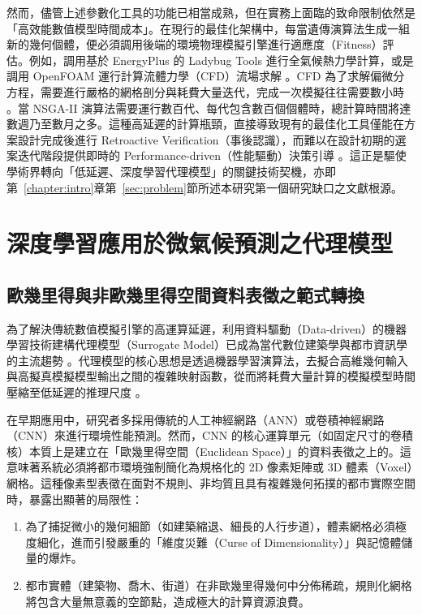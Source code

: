 然而，儘管上述參數化工具的功能已相當成熟，但在實務上面臨的致命限制依然是「高效能數值模型時間成本」。在現行的最佳化架構中，每當遺傳演算法生成一組新的幾何個體，便必須調用後端的環境物理模擬引擎進行適應度（Fitness）評估。例如，調用基於 EnergyPlus 的 Ladybug Tools 進行全氣候熱力學計算，或是調用 OpenFOAM 運行計算流體力學（CFD）流場求解 \citep{sadeghipour2013ladybug}。CFD 為了求解偏微分方程，需要進行嚴格的網格剖分與耗費大量迭代，完成一次模擬往往需要數小時 \citep{xin2025urbangraph}。當 NSGA-II 演算法需要運行數百代、每代包含數百個個體時，總計算時間將達數週乃至數月之多。這種高延遲的計算瓶頸，直接導致現有的最佳化工具僅能在方案設計完成後進行 Retroactive Verification（事後認識），而難以在設計初期的選案迭代階段提供即時的 Performance-driven（性能驅動）決策引導 \citep{aman2023ai,daglier2025developing}。這正是驅使學術界轉向「低延遲、深度學習代理模型」的關鍵技術契機，亦即第~\ref{chapter:intro}章第~\ref{sec:problem}節所述本研究第一個研究缺口之文獻根源。


\section{深度學習應用於微氣候預測之代理模型}
\label{sec:surrogate_review}

\subsection{歐幾里得與非歐幾里得空間資料表徵之範式轉換}
\label{subsec:gnn_paradigm}

為了解決傳統數值模擬引擎的高運算延遲，利用資料驅動（Data-driven）的機器學習技術建構代理模型（Surrogate Model）已成為當代數位建築學與都市資訊學的主流趨勢 \citep{westermann2019surrogate,wu2023data}。代理模型的核心思想是透過機器學習演算法，去擬合高維幾何輸入與高擬真模擬模型輸出之間的複雜映射函數，從而將耗費大量計算的模擬模型時間壓縮至低延遲的推理尺度 \citep{aman2023ai,shan2025physics}。

在早期應用中，研究者多採用傳統的人工神經網路（ANN）或卷積神經網路（CNN）來進行環境性能預測。然而，CNN 的核心運算單元（如固定尺寸的卷積核）本質上是建立在「歐幾里得空間（Euclidean Space）」的資料表徵之上的。這意味著系統必須將都市環境強制簡化為規格化的 2D 像素矩陣或 3D 體素（Voxel）網格。這種像素型表徵在面對不規則、非均質且具有複雜幾何拓撲的都市實際空間時，暴露出顯著的局限性：

\begin{enumerate}
    \item 為了捕捉微小的幾何細節（如建築縮退、細長的人行步道），體素網格必須極度細化，進而引發嚴重的「維度災難（Curse of Dimensionality）」與記憶體儲量的爆炸。
    \item 都市實體（建築物、喬木、街道）在非歐幾里得幾何中分佈稀疏，規則化網格將包含大量無意義的空節點，造成極大的計算資源浪費。
\end{enumerate}

